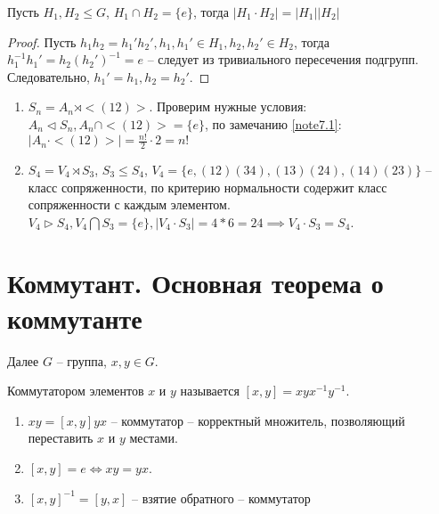 \begin{note}
    \label{note7.1}
        Пусть $H_1, H_2 \leq G$, $H_1 \cap H_2 = \{ e \}$, тогда $|H_1 \cdot H_2| = |H_1||H_2|$
    \end{note}
    
    \begin{proof}
        Пусть $h_1 h_2 = h_1' h_2', h_1, h_1' \in H_1, h_2, h_2' \in H_2$, тогда $h_1^{-1} h_1' = h_2 (h_2')^{-1} = e$ -- следует из тривиального пересечения подгрупп. Следовательно, $h_1' = h_1, h_2 = h_2'$.
    \end{proof}
    
    \begin{example}
        \begin{enumerate}
            \item $S_n = A_n \rtimes <(12)>$. Проверим нужные условия: $A_n \lhd S_n, A_n \cap <(12)> = \{ e \}$, по замечанию \ref{note7.1}: $|A_n \cdot <(12)>| = \frac{n!}{2} \cdot 2 = n!$
            \item $S_4 = V_4 \rtimes S_3$, $S_3 \leq S_4$, $V_4 = \{ e, (12)(34), (13)(24), (14)(23) \}$ -- класс сопряженности, по критерию нормальности содержит класс сопряженности с каждым элементом. $V_4 \rhd S_4, V_4 \bigcap S_3 = \{ e \}, |V_4 \cdot S_3| = 4 * 6 = 24 \implies V_4 \cdot S_3 = S_4$.
        \end{enumerate}
    \end{example}
    
    \section{Коммутант. Основная теорема о коммутанте}
    
    Далее $G$ -- группа, $x, y \in G$.
    \begin{definition}
        Коммутатором элементов $x$ и $y$ называется $[x, y] = xyx^{-1}y^{-1}$.
    \end{definition}
    
    \begin{proposition}
        \begin{enumerate}
            \item $xy = [x, y]yx$ -- коммутатор -- корректный множитель, позволяющий переставить $x$ и $y$ местами.
            \item $[x, y] = e \iff xy = yx$.
            \item $[x, y]^{-1} = [y, x]$ -- взятие обратного -- коммутатор
        \end{enumerate}
    \end{proposition}